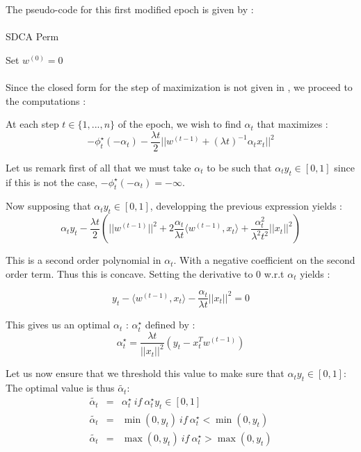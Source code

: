 \documentclass[10pt,a4paper]{article}
\begin{document}
The pseudo-code for this first modified epoch is given by : 

\paragraph{}
\begin{algorithm}[H]
\caption{SDCA Perm}
\SetAlgoLined
Set $w^{(0)} = 0$\;
\end{algorithm}



\paragraph{}
Since the closed form for the step of maximization is not given in \cite{1}, we proceed to the computations : 

At each step $t \in \{1,..., n \}$ of the epoch, we wish to find $\alpha_t$ that maximizes : 
$$ - \phi_t^{\star}(-\alpha_t) - \frac{\lambda t}{2} ||w^{(t-1)} + (\lambda t)^{-1} \alpha_t x_t ||^2$$

Let us remark first of all that we must take $\alpha_t$ to be such that $\alpha_t y_t \in [0, 1]$ since if this is not the case, $- \phi_t^{\star}(-\alpha_t) = - \infty$. 

Now supposing that $\alpha_t y_t \in [0, 1]$, developping the previous expression yields : 
$$ \alpha_t y_t - \frac{\lambda t}{2} ( ||w^{(t-1)}||^2 + 2 \frac{\alpha_t}{\lambda t} \langle w^{(t-1)}, x_t \rangle + \frac{\alpha_t^2}{\lambda^2 t^2}||x_t||^2 )$$

This is a second order polynomial in $\alpha_t$. With a negative coefficient on the second order term. Thus this is concave. Setting the derivative to 0 w.r.t $\alpha_t$ yields : 

$$ y_t - \langle w^{(t-1)}, x_t \rangle - \frac{\alpha_t}{\lambda t}||x_t||^2  = 0$$


This gives us an optimal $\alpha_t$ : $\alpha_t^{\star}$ defined by :  
$$ \alpha_t^{\star} = \frac{\lambda t}{||x_t||^2} (y_t - x_t^T w^{(t-1)})$$

Let us now ensure that we threshold this value to make sure that $\alpha_t y_t \in [0, 1]$: The optimal value is thus $\tilde{\alpha_t}$:
\begin{eqnarray*}
    \tilde{\alpha_t} &=& \alpha_t^{\star} ~if~\alpha_t^{\star} y_t \in [0, 1] \\
    \tilde{\alpha_t} &=& \min(0, y_t)~if~\alpha_t^{\star} < \min(0, y_t)\\
    \tilde{\alpha_t} &=& \max(0, y_t)~if~\alpha_t^{\star} > \max(0, y_t)\\
\end{eqnarray*}

\printbibliography
\end{document}
